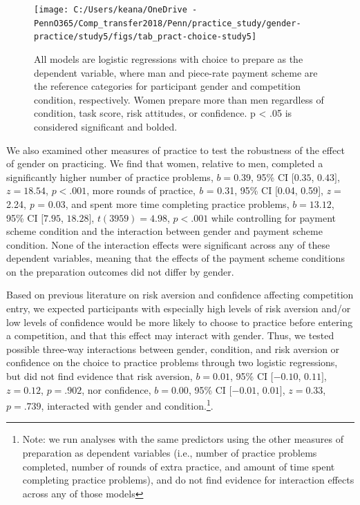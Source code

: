 \documentclass[a4paper, nobind]{templates/ociamthesis}
\begin{document}
\begin{figure}

{\centering \texttt{[image: C:/Users/keana/OneDrive - PennO365/Comp\_transfer2018/Penn/practice\_study/gender-practice/study5/figs/tab\_pract-choice-study5]} 

}

\caption{All models are logistic regressions with choice to prepare as the dependent variable, where man and piece-rate payment scheme are the reference categories for participant gender and competition condition, respectively. Women prepare more than men regardless of condition, task score, risk attitudes, or confidence. p < .05 is considered significant and bolded.}\label{fig:tab-pract-choice-study5}
\end{figure}

We also examined other measures of practice to test the robustness of the effect of gender on practicing. We find that women, relative to men, completed a significantly higher number of practice problems, \(b = 0.39\), 95\% CI \([0.35\), \(0.43]\), \(z = 18.54\), \(p < .001\), more rounds of practice, \emph{b} = 0.31, 95\% CI {[}0.04, 0.59{]}, \emph{z} = 2.24, \emph{p} = 0.03, and spent more time completing practice problems, \(b = 13.12\), 95\% CI \([7.95\), \(18.28]\), \(t(3959) = 4.98\), \(p < .001\) while controlling for payment scheme condition and the interaction between gender and payment scheme condition. None of the interaction effects were significant across any of these dependent variables, meaning that the effects of the payment scheme conditions on the preparation outcomes did not differ by gender.

Based on previous literature on risk aversion and confidence affecting competition entry, we expected participants with especially high levels of risk aversion and/or low levels of confidence would be more likely to choose to practice before entering a competition, and that this effect may interact with gender. Thus, we tested possible three-way interactions between gender, condition, and risk aversion or confidence on the choice to practice problems through two logistic regressions, but did not find evidence that risk aversion, \(b = 0.01\), 95\% CI \([-0.10\), \(0.11]\), \(z = 0.12\), \(p = .902\), nor confidence, \(b = 0.00\), 95\% CI \([-0.01\), \(0.01]\), \(z = 0.33\), \(p = .739\), interacted with gender and condition.\footnote{Note: we run analyses with the same predictors using the other measures of preparation as dependent variables (i.e., number of practice problems completed, number of rounds of extra practice, and amount of time spent completing practice problems), and do not find evidence for interaction effects across any of those models}.
\end{document}
